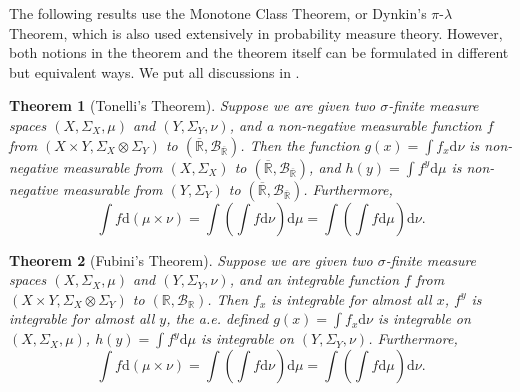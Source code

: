 \documentclass[openany]{book}
\newtheorem{theorem}{Theorem}[chapter]
\theoremstyle{definition}
\theoremstyle{remark}
\begin{document}
The following results use the Monotone Class Theorem, or Dynkin's $\pi$-$\lambda$ Theorem, which is also used extensively in probability measure theory. However, both notions in the theorem and the theorem itself can be formulated in different but equivalent ways. We put all discussions in .

\begin{theorem}[Tonelli's Theorem]
    Suppose we are given two $\sigma$-finite measure spaces $(X,\Sigma_X,\mu)$ and $(Y,\Sigma_Y,\nu)$, and a non-negative measurable function $f$ from $(X\times Y,\Sigma_X\otimes\Sigma_Y)$ to $(\overline{\mathbb{R}},\mathcal{B}_{\overline{\mathbb{R}}})$. Then the function $g(x)=\int f_x \mathrm{d}\nu$ is non-negative measurable from $(X,\Sigma_X)$ to $(\overline{\mathbb{R}},\mathcal{B}_{\overline{\mathbb{R}}})$, and $h(y)=\int f^y \mathrm{d}\mu$ is non-negative measurable from $(Y,\Sigma_Y)$ to $(\overline{\mathbb{R}},\mathcal{B}_{\overline{\mathbb{R}}})$. Furthermore,
    \begin{equation*}
        \int f \mathrm{d}(\mu\times\nu)=\int\left(\int f \mathrm{d}\nu\right)\mathrm{d}\mu=\int\left(\int f \mathrm{d}\mu\right)\mathrm{d}\nu.
    \end{equation*}
\end{theorem}
\begin{theorem}[Fubini's Theorem]
    Suppose we are given two $\sigma$-finite measure spaces $(X,\Sigma_X,\mu)$ and $(Y,\Sigma_Y,\nu)$, and an integrable function $f$ from $(X\times Y,\Sigma_X\otimes\Sigma_Y)$ to $(\mathbb{R},\mathcal{B}_{\mathbb{R}})$. Then $f_x$ is integrable for almost all $x$, $f^y$ is integrable for almost all $y$, the a.e. defined $g(x)=\int f_x \mathrm{d}\nu$ is integrable on $(X,\Sigma_X,\mu)$, $h(y)=\int f^y \mathrm{d}\mu$ is integrable on $(Y,\Sigma_Y,\nu)$. Furthermore,
    \begin{equation*}
        \int f \mathrm{d}(\mu\times\nu)=\int\left(\int f \mathrm{d}\nu\right)\mathrm{d}\mu=\int\left(\int f \mathrm{d}\mu\right)\mathrm{d}\nu.
    \end{equation*}
\end{theorem}
\end{document}
